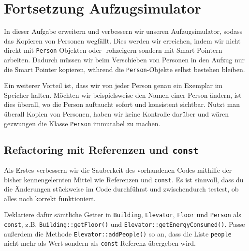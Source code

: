\section{Fortsetzung Aufzugsimulator}
In dieser Aufgabe erweitern und verbessern wir unseren Aufzugsimulator, sodass das Kopieren von Personen wegfällt.
Dies werden wir erreichen, indem wir nicht direkt mit \texttt{Person}-Objekten oder -rohzeigern sondern mit Smart Pointern arbeiten.
Dadurch müssen wir beim Verschieben von Personen in den Aufzug nur die Smart Pointer kopieren, während die \texttt{Person}-Objekte selbst bestehen bleiben.

Ein weiterer Vorteil ist, dass wir von jeder Person genau ein Exemplar im Speicher halten.
Möchten wir beispielsweise den Namen einer Person ändern, ist dies überall, wo die Person auftaucht sofort und konsistent sichtbar.
Nutzt man überall Kopien von Personen, haben wir keine Kontrolle darüber und wären gezwungen die Klasse \texttt{Person} immutabel zu machen.


\subsection{Refactoring mit Referenzen und \texttt{const}}
Als Erstes verbessern wir die Sauberkeit des vorhandenen Codes mithilfe der bisher kennengelernten Mittel wie Referenzen und \texttt{const}.
Es ist sinnvoll, dass du die Änderungen stückweise im Code durchführst und zwischendurch testest, ob alles noch korrekt funktioniert.

Deklariere dafür sämtliche Getter in \texttt{Building}, \texttt{Elevator}, \texttt{Floor} und \texttt{Person} als \texttt{const}, z.B. \texttt{Building::getFloor()} und \texttt{Elevator::getEnergyConsumed()}.
Passe außerdem die Methode \texttt{Elevator::addPeople()} so an, dass die Liste \texttt{people} nicht mehr als Wert sondern als \texttt{const} Referenz übergeben wird.

